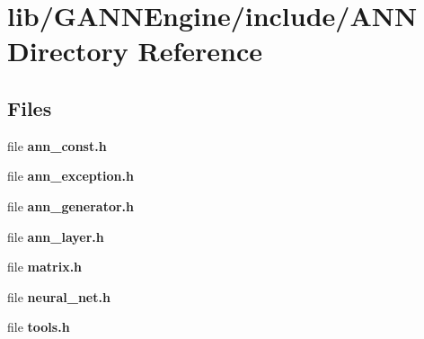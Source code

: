 \section{lib/\+G\+A\+N\+N\+Engine/include/\+A\+N\+N Directory Reference}
\label{dir_fcfdaa8b230e730b9b7b75e83d1f03a2}
\subsection*{Files}
\begin{DoxyCompactItemize}
\item 
file {\bfseries ann\+\_\+const.\+h}
\item 
file {\bfseries ann\+\_\+exception.\+h}
\item 
file {\bfseries ann\+\_\+generator.\+h}
\item 
file {\bfseries ann\+\_\+layer.\+h}
\item 
file {\bfseries matrix.\+h}
\item 
file {\bfseries neural\+\_\+net.\+h}
\item 
file {\bfseries tools.\+h}
\end{DoxyCompactItemize}
